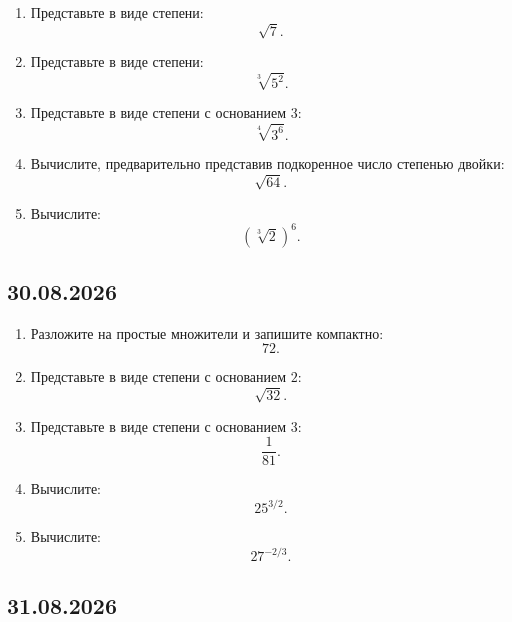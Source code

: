 \documentclass[a4paper,12pt]{article}
\newcommand{\subtopic}[1]{%
    \subsection*{\textcolor{accent}{#1}}%
}
\begin{document}
\begin{enumerate}
    \item Представьте в виде степени:
    \[
    \sqrt7.
    \]

    \item Представьте в виде степени:
    \[
    \sqrt[3]{5^2}.
    \]

    \item Представьте в виде степени с основанием \(3\):
    \[
    \sqrt[4]{3^6}.
    \]

    \item Вычислите, предварительно представив подкоренное число степенью двойки:
    \[
    \sqrt{64}.
    \]

    \item Вычислите:
    \[
    \left(\sqrt[3]{2}\right)^6.
    \]
\end{enumerate}


\newpage
\subtopic{30.08.2026}

\begin{enumerate}
    \item Разложите на простые множители и запишите компактно:
    \[
    72.
    \]

    \item Представьте в виде степени с основанием \(2\):
    \[
    \sqrt{32}.
    \]

    \item Представьте в виде степени с основанием \(3\):
    \[
    \frac1{81}.
    \]

    \item Вычислите:
    \[
    25^{3/2}.
    \]

    \item Вычислите:
    \[
    27^{-2/3}.
    \]
\end{enumerate}


\newpage
\subtopic{31.08.2026 }
\end{document}

